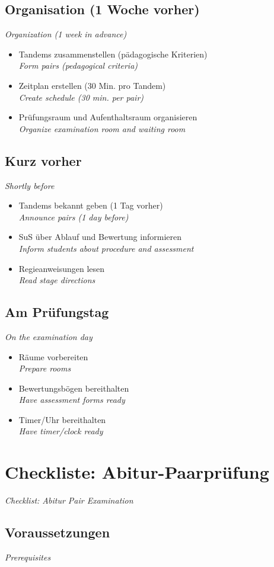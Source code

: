 \documentclass[11pt,a4paper]{article}
\newcommand{\bisection}[2]{%
    \section{#1}%
    {\small\color{englishgray}\textit{#2}}\par\vspace{6pt}%
}
\newcommand{\bisubsection}[2]{%
    \subsection{#1}%
    {\small\color{englishgray}\textit{#2}}\par\vspace{4pt}%
}
\begin{document}
\bisubsection{Organisation (1 Woche vorher)}{Organization (1 week in advance)}

\begin{itemize}[label=$\square$]
\item Tandems zusammenstellen (pädagogische Kriterien)\\ {\color{englishgray}\textit{Form pairs (pedagogical criteria)}}
\item Zeitplan erstellen (30 Min. pro Tandem)\\ {\color{englishgray}\textit{Create schedule (30 min. per pair)}}
\item Prüfungsraum und Aufenthaltsraum organisieren\\ {\color{englishgray}\textit{Organize examination room and waiting room}}
\end{itemize}

\bisubsection{Kurz vorher}{Shortly before}

\begin{itemize}[label=$\square$]
\item Tandems bekannt geben (1 Tag vorher)\\ {\color{englishgray}\textit{Announce pairs (1 day before)}}
\item SuS über Ablauf und Bewertung informieren\\ {\color{englishgray}\textit{Inform students about procedure and assessment}}
\item Regieanweisungen lesen\\ {\color{englishgray}\textit{Read stage directions}}
\end{itemize}

\bisubsection{Am Prüfungstag}{On the examination day}

\begin{itemize}[label=$\square$]
\item Räume vorbereiten\\ {\color{englishgray}\textit{Prepare rooms}}
\item Bewertungsbögen bereithalten\\ {\color{englishgray}\textit{Have assessment forms ready}}
\item Timer/Uhr bereithalten\\ {\color{englishgray}\textit{Have timer/clock ready}}
\end{itemize}

\bisection{Checkliste: Abitur-Paarprüfung}{Checklist: Abitur Pair Examination}

\bisubsection{Voraussetzungen}{Prerequisites}
\end{document}
